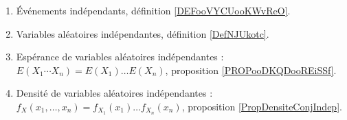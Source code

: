 


\begin{enumerate}
    \item
        Événements indépendants, définition \ref{DEFooVYCUooKWvReO}.
    \item
        Variables aléatoires indépendantes, définition \ref{DefNJUkotc}.
    \item
        Espérance de variables aléatoires indépendantes : \( E(X_1\cdots X_n)=E(X_1)\ldots E(X_n)\), proposition \ref{PROPooDKQDooREiSSf}.
    \item
        Densité de variables aléatoires indépendantes : \( f_X(x_1,\ldots,x_n)=f_{X_1}(x_1)\ldots f_{X_n}(x_n)\), proposition \ref{PropDensiteConjIndep}.
\end{enumerate}
